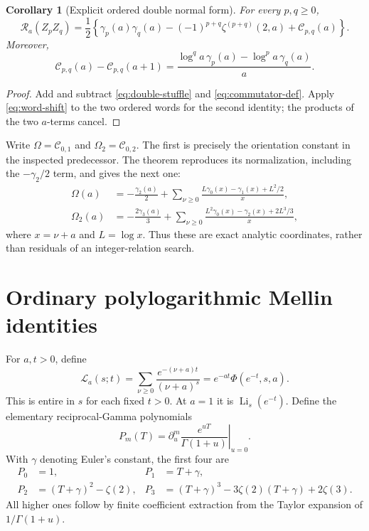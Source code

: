\documentclass[11pt]{article}
\numberwithin{equation}{section}
\newtheorem{corollary}[theorem]{Corollary}
\theoremstyle{definition}
\newcommand{\R}{\mathcal R}
\newcommand{\Li}{\operatorname{Li}}
\begin{document}
\begin{corollary}[Explicit ordered double normal form]\label{cor:double-normal}
For every $p,q\ge0$,
\begin{equation}\label{eq:double-normal}
 \R_a(Z_pZ_q)=\frac12\left\{
 \gamma_p(a)\gamma_q(a)-(-1)^{p+q}\zeta^{(p+q)}(2,a)
                         +\mathcal C_{p,q}(a)\right\}.
\end{equation}
Moreover,
\begin{equation}\label{eq:C-shift}
 \mathcal C_{p,q}(a)-\mathcal C_{p,q}(a+1)
   =\frac{\log^q a\,\gamma_p(a)-\log^p a\,\gamma_q(a)}a.
\end{equation}
\end{corollary}
\begin{proof}
Add and subtract \eqref{eq:double-stuffle} and
\eqref{eq:commutator-def}. Apply \eqref{eq:word-shift} to the two
ordered words for the second identity; the products of the two
$a$-terms cancel.
\end{proof}

Write $\Omega=\mathcal C_{0,1}$ and
$\Omega_2=\mathcal C_{0,2}$. The first is precisely the orientation
constant in the inspected predecessor. The theorem reproduces its
normalization, including the $-\gamma_2/2$ term, and gives the next one:
\begin{align}
 \Omega(a)&=-\frac{\gamma_2(a)}2+
 \sum_{\nu\ge0}\frac{L\gamma_0(x)-\gamma_1(x)+L^2/2}{x},
 \label{eq:Omega}\\
 \Omega_2(a)&=-\frac{2\gamma_3(a)}3+
 \sum_{\nu\ge0}\frac{L^2\gamma_0(x)-\gamma_2(x)+2L^3/3}{x},
 \label{eq:Omega2}
\end{align}
where $x=\nu+a$ and $L=\log x$. Thus these are exact analytic
coordinates, rather than residuals of an integer-relation search.

\section{Ordinary polylogarithmic Mellin identities}
\label{sec:mellin}
For $a,t>0$, define
\begin{equation}\label{eq:Lerch-heat}
 \mathcal L_a(s;t)=\sum_{\nu\ge0}\frac{e^{-(\nu+a)t}}{(\nu+a)^s}
                 =e^{-at}\Phi(e^{-t},s,a).
\end{equation}
This is entire in $s$ for each fixed $t>0$. At $a=1$ it is
$\Li_s(e^{-t})$. Define the elementary reciprocal-Gamma polynomials
\begin{equation}\label{eq:P-polynomials}
 P_m(T)=\left.\partial_u^m\frac{e^{uT}}{\Gamma(1+u)}\right|_{u=0}.
\end{equation}
With $\gamma$ denoting Euler's constant, the first four are
\begin{align*}
 P_0&=1,&P_1&=T+\gamma,\\
 P_2&=(T+\gamma)^2-\zeta(2),&
 P_3&=(T+\gamma)^3-3\zeta(2)(T+\gamma)+2\zeta(3).
\end{align*}
All higher ones follow by finite coefficient extraction from the
Taylor expansion of $1/\Gamma(1+u)$.
\end{document}

